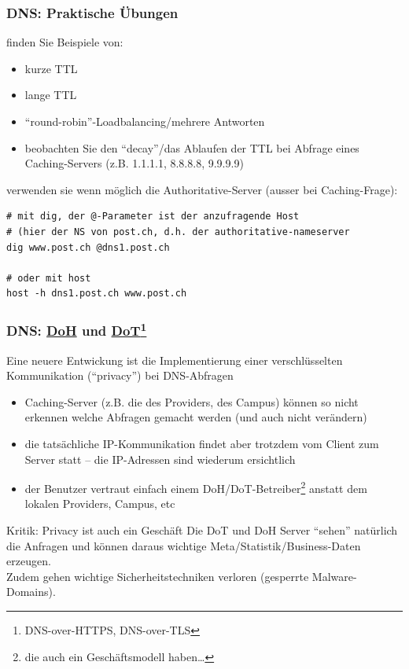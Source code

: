 \documentclass[ignorenonframetext]{beamer}
\begin{document}
\begin{frame}[fragile]
\label{exercises-2}
\frametitle{DNS: Praktische \"Ubungen}
finden Sie Beispiele von:
\begin{itemize}
  \item kurze TTL 
  \item lange TTL
  \item ``round-robin''-Loadbalancing/mehrere Antworten
  \item beobachten Sie den ``decay''/das Ablaufen der TTL bei Abfrage eines Caching-Servers (z.B. 1.1.1.1, 8.8.8.8, 9.9.9.9)
\end{itemize}
verwenden sie wenn m\"oglich die Authoritative-Server (ausser bei Caching-Frage):

\begin{small}
\begin{Verbatim}
# mit dig, der @-Parameter ist der anzufragende Host 
# (hier der NS von post.ch, d.h. der authoritative-nameserver
dig www.post.ch @dns1.post.ch

# oder mit host
host -h dns1.post.ch www.post.ch
\end{Verbatim}
\end{small}
\end{frame}


\begin{frame}\label{doh-dot}
\frametitle{DNS: \href{https://en.wikipedia.org/wiki/DNS_over_HTTPS}{DoH} und \href{https://en.wikipedia.org/wiki/DNS_over_TLS}{DoT}\footnote{DNS-over-HTTPS, DNS-over-TLS}}
Eine neuere Entwickung ist die Implementierung einer verschl\"usselten Kommunikation (``privacy'') bei DNS-Abfragen
\begin{itemize}
  \item Caching-Server (z.B. die des Providers, des Campus) k\"onnen so nicht erkennen welche Abfragen gemacht werden (und auch nicht ver\"andern)
  \item die tats\"achliche IP-Kommunikation findet aber trotzdem vom Client zum Server statt -- die IP-Adressen sind wiederum ersichtlich
  \item der Benutzer vertraut einfach einem DoH/DoT-Betreiber\footnote{die auch ein Gesch\"aftsmodell haben\ldots} anstatt dem lokalen Providers, Campus, etc
\end{itemize}
\begin{block}{Kritik: Privacy ist auch ein Gesch\"aft}
Die DoT und DoH Server ``sehen'' nat\"urlich die Anfragen und k\"onnen daraus wichtige Meta/Statistik/Business-Daten erzeugen.
\\
Zudem gehen wichtige Sicherheitstechniken verloren (gesperrte Malware-Domains).
\end{block}
\end{frame}
\end{document}
